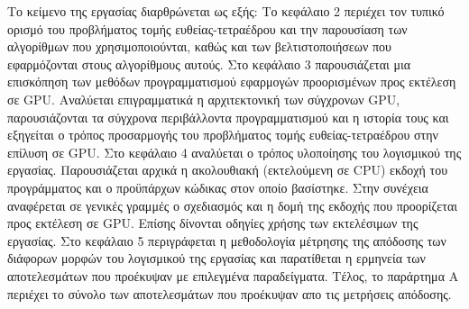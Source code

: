 Το κείμενο της εργασίας διαρθρώνεται ως εξής:
Το κεφάλαιο 2 περιέχει τον τυπικό ορισμό του προβλήματος τομής ευθείας-τετραέδρου και την παρουσίαση των αλγορίθμων που χρησιμοποιούνται, καθώς και των βελτιστοποιήσεων που εφαρμόζονται στους αλγορίθμους αυτούς.
Στο κεφάλαιο 3 παρουσιάζεται μια επισκόπηση των μεθόδων προγραμματισμού εφαρμογών προορισμένων προς εκτέλεση σε GPU. Αναλύεται επιγραμματικά η αρχιτεκτονική των σύγχρονων GPU, παρουσιάζονται τα σύγχρονα περιβάλλοντα προγραμματισμού και η ιστορία τους και εξηγείται ο τρόπος προσαρμογής του προβλήματος τομής ευθείας-τετραέδρου στην επίλυση σε GPU. 
Στο κεφάλαιο 4 αναλύεται ο τρόπος υλοποίησης του λογισμικού της εργασίας. Παρουσιάζεται αρχικά η ακολουθιακή (εκτελούμενη σε CPU) εκδοχή του προγράμματος και ο προϋπάρχων κώδικας στον οποίο βασίστηκε. Στην συνέχεια αναφέρεται σε γενικές γραμμές ο σχεδιασμός και η δομή της εκδοχής που προορίζεται προς εκτέλεση σε GPU. Επίσης δίνονται οδηγίες χρήσης των εκτελέσιμων της εργασίας.
Στο κεφάλαιο 5 περιγράφεται η μεθοδολογία μέτρησης της απόδοσης των διάφορων μορφών του λογισμικού της εργασίας και παρατίθεται η ερμηνεία των αποτελεσμάτων που προέκυψαν με επιλεγμένα παραδείγματα.
Τέλος, το παράρτημα Α περιέχει το σύνολο των αποτελεσμάτων που προέκυψαν απο τις μετρήσεις απόδοσης. 

